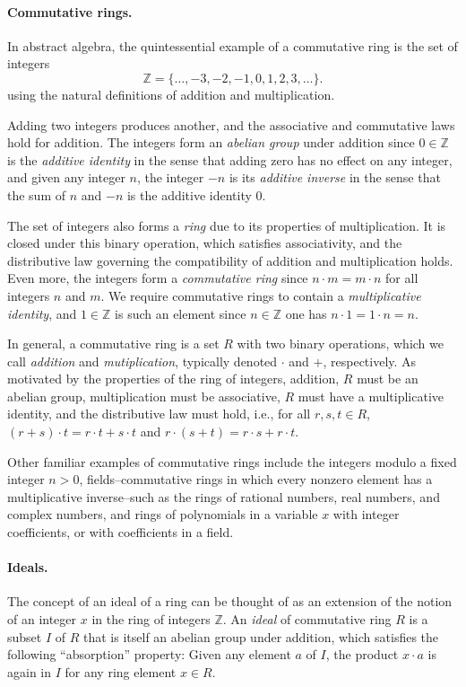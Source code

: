 \documentclass{article}
\begin{document}
\paragraph{Commutative rings.}
In abstract algebra, the quintessential example of a commutative ring is the set of integers
\[\mathbb{Z} = \{ \ldots, -3, -2, -1, 0, 1, 2, 3, \ldots \}.\]
using the natural definitions of addition and multiplication.  

Adding two integers produces another, and the associative and commutative laws hold for addition.  The integers form an \emph{abelian group} under addition since $0 \in \mathbb{Z}$ is the \emph{additive identity} in the sense that adding zero has no effect on any integer, and given any integer $n$, the integer $-n$ is its \emph{additive inverse} in the sense that the sum of $n$ and $-n$ is the additive identity $0$. 

The set of integers also forms a \emph{ring} due to its properties of multiplication.  
It is closed under this binary operation, which satisfies associativity, and the distributive law governing the compatibility of addition and multiplication holds. 
Even more, the integers form a \emph{commutative ring} 
 since $n \cdot m = m \cdot n$ for all integers $n$ and $m$.  We require commutative rings to contain a \emph{multiplicative identity}, and $1 \in \mathbb{Z}$ is such an element since 
   $n \in \mathbb{Z}$ one has $n \cdot 1 = 1 \cdot n = n$. 

In general, a commutative ring is a set $R$ with two binary operations, which we call \emph{addition} and \emph{mutiplication}, typically denoted $\cdot$ and $+$, respectively.  As motivated by the properties of the ring of integers, addition, $R$ must be an abelian group, multiplication must be associative, $R$ must have a multiplicative identity, and the distributive law must hold, i.e., for all $r, s, t \in R$, $(r+s)\cdot t = r \cdot t + s \cdot t$ and $r \cdot (s+t) = r \cdot s + r \cdot t$.   

Other familiar examples of commutative rings include the integers modulo a fixed integer $n>0$, fields--commutative rings in which every nonzero element has a multiplicative inverse--such as the rings of rational numbers, real numbers, and complex numbers, and rings of polynomials in a variable $x$ with integer coefficients, or with coefficients in a field.


\paragraph{Ideals.}
The concept of an {ideal} of a ring can be thought of as an extension of the notion of an integer $x$ in the ring of integers $\mathbb{Z}$. 
An \emph{ideal} of commutative ring $R$ is a subset $I$ of $R$ that is itself 
an abelian group under addition,  
which satisfies the following ``absorption'' property: Given any element $a$ of $I$, 
the product  $x \cdot a$ is again in $I$ for any ring element $x \in R$. 
\end{document}
